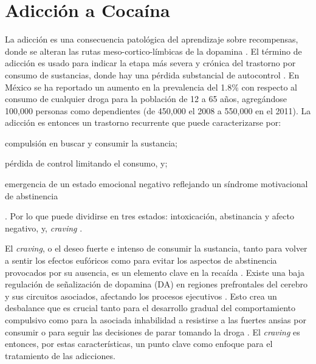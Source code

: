 \section{Adicción a Cocaína}

La adicción es una consecuencia patológica del aprendizaje sobre recompensas, donde se alteran las rutas meso-cortico-límbicas de la dopamina \parencite{Volkow2016}.
El término de adicción es usado para indicar la etapa más severa y crónica del trastorno por consumo de sustancias, donde hay una pérdida substancial de autocontrol \parencite{Volkow2016}.
En México se ha reportado un aumento en la prevalencia del 1.8\% con respecto al consumo de cualquier droga para la población de 12 a 65 años, agregándose 100,000 personas como dependientes (de 450,000 el 2008 a 550,000 en el 2011)\parencite{InstitutoNacionaldePsiquiatriaRamondelaFuenteMuniz2012a}.
La adicción es entonces un trastorno recurrente que puede caracterizarse por:
\begin{enumerate*}
    \item{compulsión en buscar y consumir la sustancia; }
    \item{pérdida de control limitando el consumo, y; }
    \item{emergencia de un estado emocional negativo reflejando un síndrome motivacional de abstinencia}
\end{enumerate*}.
Por lo que puede dividirse en tres estados: intoxicación, abstinancia y afecto negativo, y, \textit{craving} \parencite{Koob2010a}.\par
El \textit{craving}, o el deseo fuerte e intenso de consumir la sustancia, tanto para volver a sentir los efectos eufóricos como para evitar los aspectos de abstinencia provocados por su ausencia, es un elemento clave en la recaída \parencite{Koob2010a}.
Existe una baja regulación de señalización de dopamina (DA) en regiones prefrontales del cerebro y sus circuitos asociados, afectando los procesos ejecutivos \parencite{Goldstein2012a}.
Esto crea un desbalance que es crucial tanto para el desarrollo gradual del comportamiento compulsivo como para la asociada inhabilidad a resistirse a las fuertes ansias por consumir o para seguir las decisiones de parar tomando la droga \parencite{Volkow2016}.
El \textit{craving} es entonces, por estas características, un punto clave como enfoque para el tratamiento de las adicciones.

